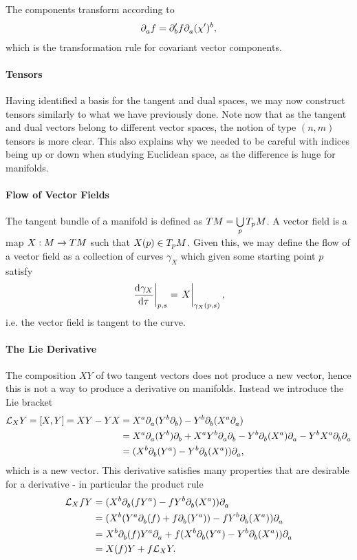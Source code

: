 The components transform according to
\begin{align*}
	\del{a}{f} = \del[\prime]{b}{f}\del{a}{(\chi^{\prime})^{b}},
\end{align*}
which is the transformation rule for covariant vector components.

\paragraph{Tensors}
Having identified a basis for the tangent and dual spaces, we may now construct tensors similarly to what we have previously done. Note now that as the tangent and dual vectors belong to different vector spaces, the notion of type $(n, m)$ tensors is more clear. This also explains why we needed to be careful with indices being up or down when studying Euclidean space, as the difference is huge for manifolds.

\paragraph{Flow of Vector Fields}
The tangent bundle of a manifold is defined as $TM = \bigcup\limits_{p}\ts{p}{M}$. A vector field is a map $X: M\to\tbun{M}$ such that $X(p)\in\ts{p}{M}$. Given this, we may define the flow of a vector field as a collection of curves $\gamma_{X}$ which given some starting point $p$ satisfy
\begin{align*}
	\deval{\gamma_{X}}{\tau}{p, s} = \eval{X}_{\gamma_{X}(p, s)},
\end{align*}
i.e. the vector field is tangent to the curve.

\paragraph{The Lie Derivative}
The composition $XY$ of two tangent vectors does not produce a new vector, hence this is not a way to produce a derivative on manifolds. Instead we introduce the Lie bracket
\begin{align*}
	\lied{X}{Y} =\comm{X}{Y} = XY - YX &= X^{a}\del{a}{(Y^{b}\del{b}{})} - Y^{b}\del{b}{(X^{a}\del{a}{})} \\
	                                   &= X^{a}\del{a}{(Y^{b})}\del{b}{} + X^{a}Y^{b}\del{a}{\del{b}{}} - Y^{b}\del{b}{(X^{a})}\del{a}{} - Y^{b}X^{a}\del{b}{\del{a}{}} \\
	                                   &= (X^{b}\del{b}{(Y^{a})} - Y^{b}\del{b}{(X^{a})})\del{a}{},
\end{align*}
which is a new vector. This derivative satisfies many properties that are desirable for a derivative - in particular the product rule
\begin{align*}
	\lied{X}{fY} &= (X^{b}\del{b}{(fY^{a})} - fY^{b}\del{b}{(X^{a})})\del{a}{} \\
	             &= (X^{b}(Y^{a}\del{b}{(f)} + f\del{b}{(Y^{a})}) - fY^{b}\del{b}{(X^{a})})\del{a}{} \\
	             &= X^{b}\del{b}{(f)}Y^{a}\del{a}{} + f(X^{b}\del{b}{(Y^{a})} - Y^{b}\del{b}{(X^{a})})\del{a}{} \\
	             &= X(f)Y + f\lied{X}{Y}.
\end{align*}


